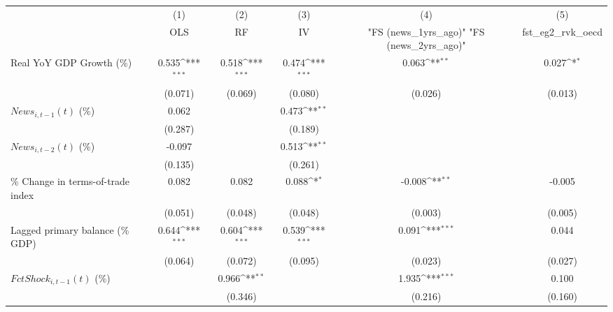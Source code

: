 {
\def\sym#1{\ifmmode^{#1}\else\(^{#1}\)\fi}
\begin{tabular}{l*{5}{c}}
\toprule
                    &\multicolumn{1}{c}{(1)}&\multicolumn{1}{c}{(2)}&\multicolumn{1}{c}{(3)}&\multicolumn{1}{c}{(4)}&\multicolumn{1}{c}{(5)}\\
                    &\multicolumn{1}{c}{OLS}&\multicolumn{1}{c}{RF}&\multicolumn{1}{c}{IV}&\multicolumn{1}{c}{ "FS (news_1yrs_ago)"  "FS (news_2yrs_ago)" }&\multicolumn{1}{c}{fst_eg2_rvk_oecd}\\
\midrule
Real YoY GDP Growth (\%)&       0.535\sym{***}&       0.518\sym{***}&       0.474\sym{***}&       0.063\sym{**} &       0.027\sym{*}  \\
                    &     (0.071)         &     (0.069)         &     (0.080)         &     (0.026)         &     (0.013)         \\
\addlinespace
$ News_{i,t-1}(t)$ (\%)&       0.062         &                     &       0.473\sym{**} &                     &                     \\
                    &     (0.287)         &                     &     (0.189)         &                     &                     \\
\addlinespace
$ News_{i,t-2}(t)$ (\%)&      -0.097         &                     &       0.513\sym{**} &                     &                     \\
                    &     (0.135)         &                     &     (0.261)         &                     &                     \\
\addlinespace
\% Change in terms-of-trade index&       0.082         &       0.082         &       0.088\sym{*}  &      -0.008\sym{**} &      -0.005         \\
                    &     (0.051)         &     (0.048)         &     (0.048)         &     (0.003)         &     (0.005)         \\
\addlinespace
Lagged primary balance (\% GDP)&       0.644\sym{***}&       0.604\sym{***}&       0.539\sym{***}&       0.091\sym{***}&       0.044         \\
                    &     (0.064)         &     (0.072)         &     (0.095)         &     (0.023)         &     (0.027)         \\
\addlinespace
$ FctShock_{i,t-1}(t)$ (\%)&                     &       0.966\sym{**} &                     &       1.935\sym{***}&       0.100         \\
                    &                     &     (0.346)         &                     &     (0.216)         &     (0.160)         \\

\end{tabular}}
